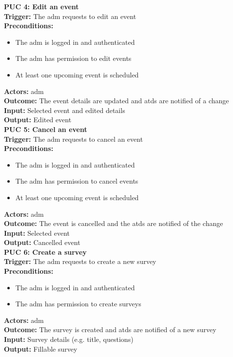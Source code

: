\documentclass[12pt]{article}
\begin{document}
{\textbf{PUC 4: Edit an event} \\
\textbf{Trigger:} The \gls{adm} requests to edit an event \\
\textbf{Preconditions:}
\begin{itemize}
  \item The \gls{adm} is logged in and authenticated
  \item The \gls{adm} has permission to edit events
  \item At least one upcoming event is scheduled
\end{itemize}
\textbf{Actors:} \Gls{adm} \\
\textbf{Outcome:} The event details are updated and \glspl{atd} are notified of a change \\
\textbf{Input:} Selected event and              edited details \\
\textbf{Output:} Edited event \\[1em]

\textbf{PUC 5: Cancel an event} \\
\textbf{Trigger:} The \gls{adm} requests to cancel an event \\
\textbf{Preconditions:}
\begin{itemize}
  \item The \gls{adm} is logged in and authenticated
  \item The \gls{adm} has permission to cancel events
  \item At least one upcoming event is scheduled
\end{itemize}
\textbf{Actors:} \Gls{adm} \\
\textbf{Outcome:} The event is cancelled and the \glspl{atd} are notified of the change \\
\textbf{Input:} Selected event \\
\textbf{Output:} Cancelled event \\[1em]

\textbf{PUC 6: Create a survey} \\
\textbf{Trigger:} The \gls{adm} requests to create a new survey \\
\textbf{Preconditions:}
\begin{itemize}
  \item The \gls{adm} is logged in and authenticated
  \item The \gls{adm} has permission to create surveys
\end{itemize}
\textbf{Actors:} \Gls{adm} \\
\textbf{Outcome:} The survey is created and \glspl{atd} are notified of a new survey \\
\textbf{Input:} Survey details (e.g. title, questions) \\
\textbf{Output:} Fillable survey \\[1em]

}
\end{document}
